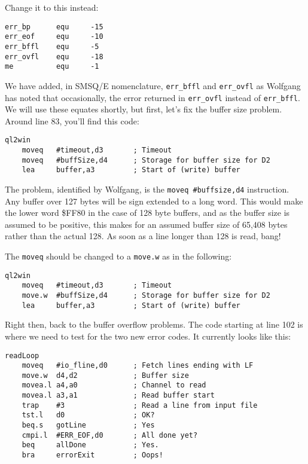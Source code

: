Change it to this instead:

\begin{lstlisting}[showstringspaces=false,tabsize=4]
err_bp      equ     -15
err_eof     equ     -10
err_bffl    equ     -5
err_ovfl    equ     -18
me          equ     -1
\end{lstlisting}

We have added, in SMSQ/E nomenclature, \texttt{err\_bffl} and \texttt{err\_ovfl}
as Wolfgang has noted that occasionally, the error returned in \texttt{err\_ovfl}
instead of \texttt{err\_bffl}. We will use these equates shortly,
but first, let's fix the buffer size problem. Around line 83, you'll
find this code:

\begin{lstlisting}[showstringspaces=false,tabsize=4]
ql2win
    moveq   #timeout,d3       ; Timeout
    moveq   #buffSize,d4      ; Storage for buffer size for D2
    lea     buffer,a3         ; Start of (write) buffer
\end{lstlisting}

The problem, identified by Wolfgang, is the \texttt{moveq \#buffsize,d4}
instruction. Any buffer over 127 bytes will be sign extended to a
long word. This would make the lower word \$FF80 in the case of 128
byte buffers, and as the buffer size is assumed to be positive, this
makes for an assumed buffer size of 65,408 bytes rather than the actual
128. As soon as a line longer than 128 is read, bang!

The \texttt{moveq} should be changed to a \texttt{move.w} as in the
following:

\begin{lstlisting}[showstringspaces=false,tabsize=4]
ql2win
    moveq   #timeout,d3       ; Timeout
    move.w  #buffSize,d4      ; Storage for buffer size for D2
    lea     buffer,a3         ; Start of (write) buffer
\end{lstlisting}

Right then, back to the buffer overflow problems. The code starting
at line 102 is where we need to test for the two new error codes.
It currently looks like this:

\begin{lstlisting}[showstringspaces=false,tabsize=4]
readLoop
    moveq   #io_fline,d0      ; Fetch lines ending with LF
    move.w  d4,d2             ; Buffer size
    movea.l a4,a0             ; Channel to read
    movea.l a3,a1             ; Read buffer start
    trap    #3                ; Read a line from input file
    tst.l   d0                ; OK?
    beq.s   gotLine           ; Yes
    cmpi.l  #ERR_EOF,d0       ; All done yet?
    beq     allDone           ; Yes.
    bra     errorExit         ; Oops!
\end{lstlisting}

